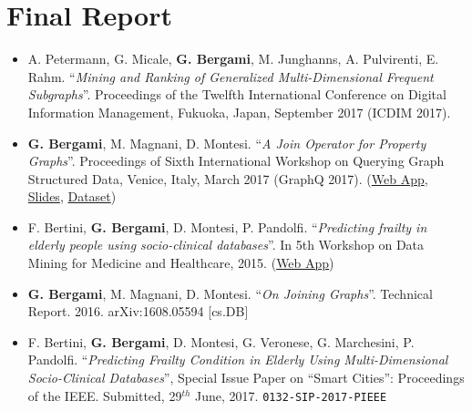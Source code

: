 \chapter*{Final Report}


\begin{itemize}
\item A. Petermann, G. Micale, \textbf{G. Bergami}, M. Junghanns, A. Pulvirenti, E. Rahm. ``\textit{Mining and Ranking of Generalized Multi-Dimensional Frequent Subgraphs}''. Proceedings of the Twelfth International Conference on Digital Information Management, Fukuoka, Japan, September 2017 (ICDIM 2017).
\item \textbf{G. Bergami}, M. Magnani, D. Montesi. ``\textit{A Join Operator for Property Graphs}''. Proceedings of Sixth International Workshop on Querying Graph Structured Data, Venice, Italy, March 2017 (GraphQ 2017). (\href{http://jackbergus.alwaysdata.net/joinapp/}{Web App}, \href{https://www.slideshare.net/jackbergus/a-join-operator-for-property-graphs}{Slides}, \href{http://smartdata.cs.unibo.it/data/GRAPH/BolognaGraph2016.tar.gz}{Dataset})
\item F. Bertini, \textbf{G. Bergami}, D. Montesi, P. Pandolfi. ``\textit{Predicting frailty in elderly people using socio-clinical databases}''. In 5th Workshop on Data Mining for Medicine and Healthcare, 2015. (\href{http://jackbergus.alwaysdata.net/calc/index.html}{Web App})
\end{itemize}

\begin{itemize}
	\item \textbf{G. Bergami},  M. Magnani, D. Montesi. ``\textit{On Joining Graphs}''. Technical Report. 2016.  	arXiv:1608.05594 [cs.DB]
\end{itemize}

\begin{itemize}
	\item F. Bertini, \textbf{G. Bergami}, D. Montesi, G. Veronese,  G. Marchesini, P. Pandolfi. ``\textit{Predicting Frailty Condition in Elderly Using Multi-Dimensional Socio-Clinical Databases}'', Special Issue Paper on ``Smart Cities'': Proceedings of the IEEE. Submitted, 29$^{th}$ June, 2017. \texttt{0132-SIP-2017-PIEEE}
\end{itemize}

